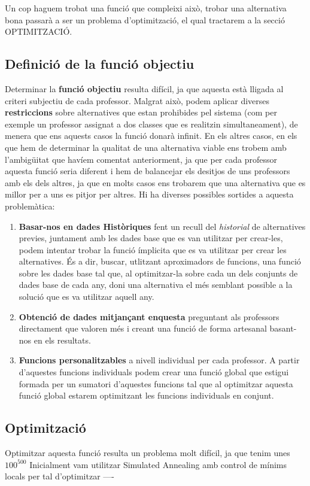 \documentclass[10pt]{proc}
\begin{document}
Un cop haguem trobat una funció que compleixi això, trobar una alternativa bona passarà a ser un problema d'optimització, el qual tractarem a la secció OPTIMITZACIÓ.
\\
\subsection{Definició de la funció objectiu}
Determinar la \textbf{funció objectiu} resulta difícil, ja que aquesta està lligada al criteri subjectiu de cada professor. Malgrat això, podem aplicar diverses \textbf{restriccions} sobre alternatives que estan prohibides pel sistema (com per exemple un professor assignat a dos classes que es realitzin simultaneament), de menera que ens aquests casos la funció donarà infinit. En els altres casos, en els que hem de determinar la qualitat de una alternativa viable ens trobem amb l'ambigüitat que havíem comentat anteriorment, ja que per cada professor aquesta funció seria diferent i hem de balancejar els desitjos de uns professors amb els dels altres, ja que en molts casos ens trobarem que una alternativa que es millor per a uns es pitjor per altres. Hi ha diverses possibles sortides a aquesta problemàtica:
\begin{enumerate}
	\item \textbf{Basar-nos en dades Històriques} fent un recull del \textit{historial}  de alternatives previes, juntament amb les dades base que es van utilitzar per crear-les, podem intentar trobar la funció ímplicita que es va utilitzar per crear les alternatives. És a dir, buscar, utlitzant aproximadors de funcions, una funció sobre les dades base tal que, al optimitzar-la sobre cada un dels conjunts de dades base de cada any, doni una alternativa el més semblant possible a la solució que es va utilitzar aquell any. 
	\item \textbf{Obtenció de dades mitjançant enquesta} preguntant als professors directament que valoren més i creant una funció de forma artesanal basant-nos en els resultats.
	\item \textbf{Funcions personalitzables} a nivell individual per cada professor. A partir d'aquestes funcions individuals podem crear una funció global que estigui formada per un sumatori d'aquestes funcions tal que al optimitzar aquesta funció global estarem optimitzant les funcions individuals en conjunt.
\end{enumerate} 

\subsection{Optimització}
Optimitzar aquesta funció resulta un problema molt difícil, ja que tenim unes $100^500$
Inicialment vam utilitzar Simulated Annealing amb control de mínims locals per tal d'optimitzar 
----
\\
\newpage
\end{document}
